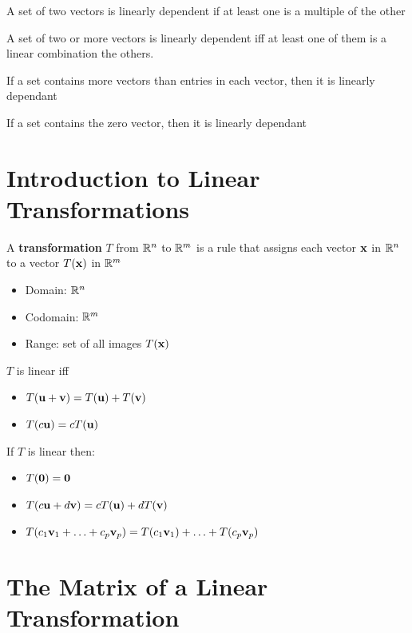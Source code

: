 \documentclass{report}
\begin{document}
A set of two vectors is linearly dependent if at least one is a multiple of the other

\begin{theorem}
\end{theorem}
A set of two or more vectors is linearly dependent iff at least one of them is a linear combination the others.

\begin{theorem}
\end{theorem}
If a set contains more vectors than entries in each vector, then it is linearly dependant

\begin{theorem}
\end{theorem}
If a set contains the zero vector, then it is linearly dependant

\section{Introduction to Linear Transformations}

A \textbf{transformation} $T$ from $\mathbb{R}^n$ to $\mathbb{R}^m$ is a rule that assigns each vector $\mathbf{x}$ in
$\mathbb{R}^n$ to a vector $T(\mathbf{x})$ in $\mathbb{R}^m$
\begin{itemize}
    \item Domain: $\mathbb{R}^n$
    \item Codomain: $\mathbb{R}^m$
    \item Range: set of all images $T(\mathbf{x})$
\end{itemize}

\begin{definition}
    $T$ is linear iff \begin{itemize}
        \item $T(\mathbf{u} + \mathbf{v}) = T(\mathbf{u}) + T(\mathbf{v})$
        \item $T(c\mathbf{u}) = c T(\mathbf{u})$
    \end{itemize}
\end{definition}

If $T$ is linear then:
\begin{itemize}
    \item $T(\mathbf{0}) = \mathbf{0}$
    \item $T(c\mathbf{u} + d\mathbf{v}) = cT(\mathbf{u}) + dT(\mathbf{v})$
    \item $T(c_1\mathbf{v}_1 + \ldots + c_p\mathbf{v}_p) = T(c_1\mathbf{v}_1) + \ldots + T(c_p\mathbf{v}_p)$
\end{itemize}

\section{The Matrix of a Linear Transformation}
\end{document}

